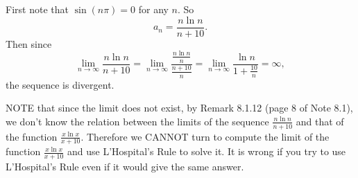 \documentclass[10pt]{amsart}%
\begin{document}
First note that $\sin(n\pi)=0$ for any $n$. So \[a_n=\frac{n\ln n}{n+10}.\]
Then since \[\lim_{n\rightarrow\infty}\frac{n\ln n}{n+10}=\lim_{n\rightarrow\infty}\frac{\frac{n\ln n}{n}}{\frac{n+10}{n}}=\lim_{n\rightarrow\infty}\frac{\ln n}{1+\frac{10}{n}}=\infty,\]
the sequence is divergent.

{\color{red}\bigskip NOTE that since the limit does not exist, by Remark 8.1.12 (page 8 of Note 8.1), we don't know the relation between the limits of the sequence $\displaystyle\frac{n\ln n}{n+10}$ and that of the function $\displaystyle\frac{x\ln x}{x+10}$. Therefore we CANNOT turn to compute the limit of the function $\displaystyle\frac{x\ln x}{x+10}$ and use L'Hospital's Rule to solve it. It is wrong if you try to use L'Hospital's Rule even if it would give the same answer.  }

%
\end{document}
